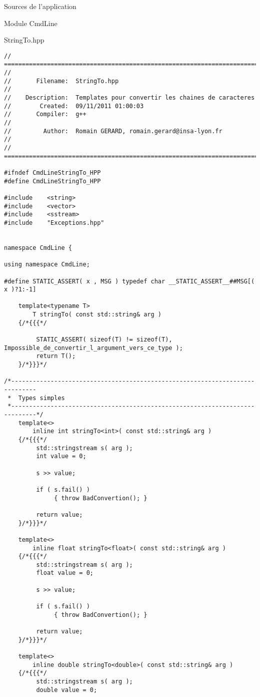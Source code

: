 \documentclass{article}
\begin{document}
\begin{section}{Sources de l'application}
\begin{subsection}{Module CmdLine}
  \newpage
  \begin{paragraph}{StringTo.hpp}
   \begin{verbatim}
// =====================================================================================
// 
//       Filename:  StringTo.hpp
// 
//    Description:  Templates pour convertir les chaines de caracteres
//        Created:  09/11/2011 01:00:03
//       Compiler:  g++
// 
//         Author:  Romain GERARD, romain.gerard@insa-lyon.fr
// 
// =====================================================================================

#ifndef CmdLineStringTo_HPP
#define CmdLineStringTo_HPP

#include	<string>
#include	<vector>
#include	<sstream>
#include	"Exceptions.hpp"


namespace CmdLine {

using namespace CmdLine;

#define STATIC_ASSERT( x , MSG ) typedef char __STATIC_ASSERT__##MSG[( x )?1:-1]

    template<typename T>
        T stringTo( const std::string& arg )
    {/*{{{*/
       
         STATIC_ASSERT( sizeof(T) != sizeof(T),  Impossible_de_convertir_l_argument_vers_ce_type );
         return T();
    }/*}}}*/

/*-----------------------------------------------------------------------------
 *  Types simples
 *-----------------------------------------------------------------------------*/
    template<>
        inline int stringTo<int>( const std::string& arg )
    {/*{{{*/
         std::stringstream s( arg );
         int value = 0;

         s >> value;

         if ( s.fail() )
              { throw BadConvertion(); }

         return value;
    }/*}}}*/

    template<>
        inline float stringTo<float>( const std::string& arg )
    {/*{{{*/
         std::stringstream s( arg );
         float value = 0;

         s >> value;

         if ( s.fail() )
              { throw BadConvertion(); }

         return value;
    }/*}}}*/

    template<>
        inline double stringTo<double>( const std::string& arg )
    {/*{{{*/
         std::stringstream s( arg );
         double value = 0;


\end{verbatim}
\end{paragraph}
\end{subsection}
\end{section}
\end{document}
